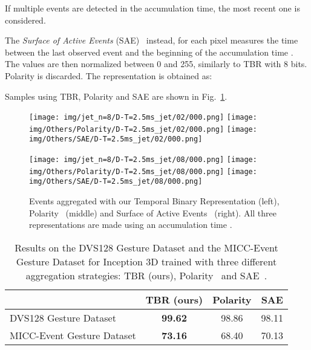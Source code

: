 \documentclass[a4paper,conference]{IEEEtran}
\begin{document}
If multiple events are detected in the accumulation time, the most recent one is considered.

The \textit{Surface of Active Events} (SAE)~\cite{mueggler2017fast} instead, for each pixel measures the time between the last observed event and the beginning of the accumulation time . The values are then normalized between 0 and 255, similarly to TBR with 8 bits. Polarity is discarded. The representation  is obtained as:


Samples using TBR, Polarity and SAE are shown in Fig.~\ref{fig:accumulation_strategies}.

\begin{figure}[!t]
	\centering
	\texttt{[image: img/jet\_n=8/D-T=2.5ms\_jet/02/000.png]}
	\texttt{[image: img/Others/Polarity/D-T=2.5ms\_jet/02/000.png]}
	\texttt{[image: img/Others/SAE/D-T=2.5ms\_jet/02/000.png]} \\ \medskip
	
	\texttt{[image: img/jet\_n=8/D-T=2.5ms\_jet/08/000.png]}
	\texttt{[image: img/Others/Polarity/D-T=2.5ms\_jet/08/000.png]}
	\texttt{[image: img/Others/SAE/D-T=2.5ms\_jet/08/000.png]}
	
	\caption{Events aggregated with our Temporal Binary Representation (left), Polarity~\cite{nguyen2019real} (middle) and Surface of Active Events~\cite{mueggler2017fast} (right). All three representations are made using an accumulation time .}
	\label{fig:accumulation_strategies}
\end{figure}

\begin{table}[t]
	\caption{Results on the DVS128 Gesture Dataset and the MICC-Event Gesture Dataset for Inception 3D trained with three different aggregation strategies: TBR (ours), Polarity~\cite{nguyen2019real} and SAE~\cite{mueggler2017fast}.}
	\label{tab:micc-event}
	\begin{tabular}{l|c|c|c}
		& TBR (ours) & Polarity & SAE   \\ \hline
		DVS128 Gesture Dataset     & \textbf{99.62}		&	98.86		& 98.11 \\
		MICC-Event Gesture Dataset & \textbf{73.16}		& 	68.40		& 70.13 \\
	\end{tabular}
\end{table}
\end{document}
